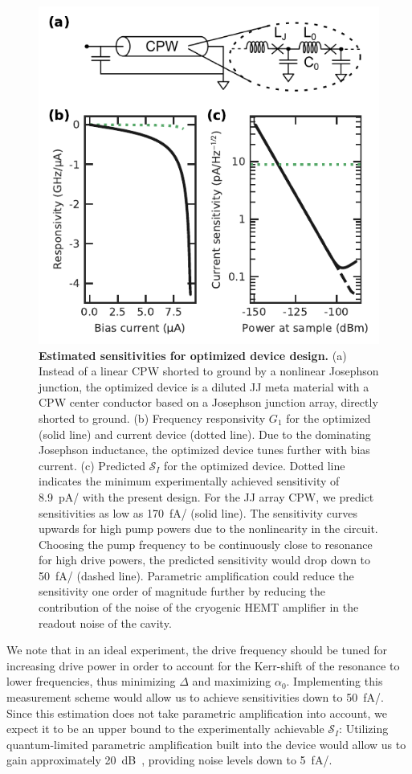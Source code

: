 \begin{figure}[t]
	\centering
	\includegraphics[width=.5\linewidth]{chapter-currentdetection/figures/Figure5}
	\caption{
		\textbf{Estimated sensitivities for optimized device design.}
		(a) Instead of a linear CPW shorted to ground by a nonlinear Josephson junction, the optimized device is a diluted JJ meta material with a CPW center conductor based on a Josephson junction array, directly shorted to ground.
		(b) Frequency responsivity $G_1$ for the optimized (solid line) and current device (dotted line).
		Due to the dominating Josephson inductance, the optimized device tunes further with bias current.
		(c) Predicted $\mathcal{S}_I$ for the optimized device.
		Dotted line indicates the minimum experimentally achieved sensitivity of \SI{8.9}{\pico\ampere/\sqrthz} with the present design.
		For the JJ array CPW, we predict sensitivities as low as \SI{170}{\femto\ampere/\sqrthz} (solid line).
		The sensitivity curves upwards for high pump powers due to the nonlinearity in the circuit.
		Choosing the pump frequency to be continuously close to resonance for high drive powers, the predicted sensitivity would drop down to \SI{50}{\femto\ampere/\sqrthz} (dashed line).
		Parametric amplification could reduce the sensitivity one order of magnitude further by reducing the contribution of the noise of the cryogenic HEMT amplifier in the readout noise of the cavity.
		\label{fig:figure5}
	}
\end{figure}

We note that in an ideal experiment, the drive frequency should be tuned for increasing drive power in order to account for the Kerr-shift of the resonance to lower frequencies, thus minimizing $\Delta$ and maximizing $\alpha_0$.
% 
Implementing this measurement scheme would allow us to achieve sensitivities down to \SI{50}{\femto\ampere/\sqrthz}.
% 
Since this estimation does not take parametric amplification into account, we expect it to be an upper bound to the experimentally achievable $\mathcal{S}_I$:
% 
Utilizing quantum-limited parametric amplification built into the device would allow us to gain approximately \SI{20}{dB}~\cite{stehlikFastChargeSensing2015,pogorzalekHystereticFluxResponse2017,planatUnderstandingSaturationPower2019}, providing noise levels down to \SI{5}{\femto\ampere/\sqrthz}.


